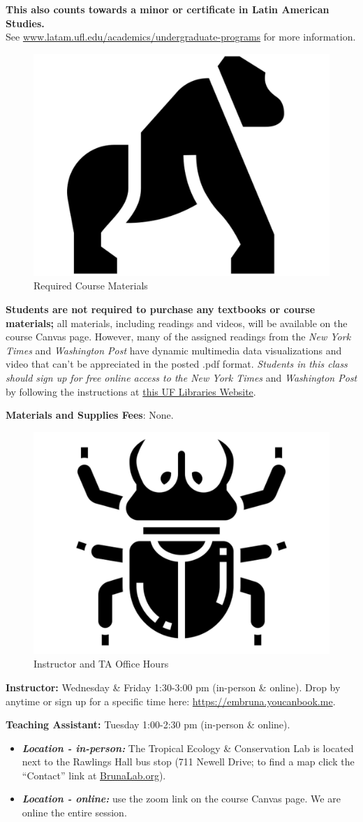 \documentclass[
  12pt,
]{article}
\begin{document}
\vspace{0.2cm}

\textbf{This also counts towards a minor or certificate in Latin
American Studies.}\\
See
\href{https://www.latam.ufl.edu/academics/undergraduate-programs/}{www.latam.ufl.edu/academics/undergraduate-programs}
for more information.

\begin{figure}

\includegraphics[width=0.03\linewidth]{./icons/gorilla} \hfill{}

\caption{Required Course Materials   }\label{fig:materials}
\end{figure}

\vspace{-0.3cm}

\textbf{Students are not required to purchase any textbooks or course
materials;} all materials, including readings and videos, will be
available on the course Canvas page. However, many of the assigned
readings from the \emph{New York Times} and \emph{Washington Post} have
dynamic multimedia data visualizations and video that can't be
appreciated in the posted .pdf format. \emph{Students in this class
should sign up for free online access to the New York Times} and
\emph{Washington Post} by following the instructions at
\href{https://businesslibrary.uflib.ufl.edu/c.php?g=943928&p=7708734}{this
UF Libraries Website}.

\textbf{Materials and Supplies Fees}: None.

\newpage

\begin{figure}[h]

\includegraphics[width=0.03\linewidth]{./icons/beetle} \hfill{}

\caption{Instructor and TA Office Hours}\label{fig:office_hours}
\end{figure}

\textbf{Instructor:} Wednesday \& Friday 1:30-3:00 pm (in-person \&
online). Drop by anytime or sign up for a specific time here:
\url{https://embruna.youcanbook.me}.

\textbf{Teaching Assistant:} Tuesday 1:00-2:30 pm (in-person \& online).

\begin{itemize}
\item
  \textbf{\emph{Location - in-person:}} The Tropical Ecology \&
  Conservation Lab is located next to the Rawlings Hall bus stop (711
  Newell Drive; to find a map click the ``Contact'' link at
  \href{http://brunalab.org}{BrunaLab.org}).
\item
  \textbf{\emph{Location - online:}} use the zoom link on the course
  Canvas page. We are online the entire session.
\end{itemize}
\end{document}
